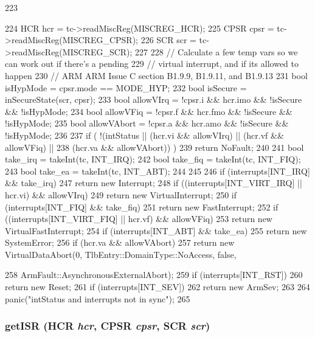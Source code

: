 \begin{DoxyCode}
223     {
224         HCR  hcr  = tc->readMiscReg(MISCREG_HCR);
225         CPSR cpsr = tc->readMiscReg(MISCREG_CPSR);
226         SCR  scr  = tc->readMiscReg(MISCREG_SCR);
227 
228         // Calculate a few temp vars so we can work out if there's a pending
229         // virtual interrupt, and if its allowed to happen
230         // ARM ARM Issue C section B1.9.9, B1.9.11, and B1.9.13
231         bool isHypMode   = cpsr.mode == MODE_HYP;
232         bool isSecure    = inSecureState(scr, cpsr);
233         bool allowVIrq   = !cpsr.i && hcr.imo && !isSecure && !isHypMode;
234         bool allowVFiq   = !cpsr.f && hcr.fmo && !isSecure && !isHypMode;
235         bool allowVAbort = !cpsr.a && hcr.amo && !isSecure && !isHypMode;
236 
237         if ( !(intStatus || (hcr.vi && allowVIrq) || (hcr.vf && allowVFiq) ||
238                (hcr.va && allowVAbort)) )
239             return NoFault;
240 
241         bool take_irq = takeInt(tc, INT_IRQ);
242         bool take_fiq = takeInt(tc, INT_FIQ);
243         bool take_ea =  takeInt(tc, INT_ABT);
244 
245 
246         if (interrupts[INT_IRQ] && take_irq)
247             return new Interrupt;
248         if ((interrupts[INT_VIRT_IRQ] || hcr.vi) && allowVIrq)
249             return new VirtualInterrupt;
250         if (interrupts[INT_FIQ] && take_fiq)
251             return new FastInterrupt;
252         if ((interrupts[INT_VIRT_FIQ] || hcr.vf) && allowVFiq)
253             return new VirtualFastInterrupt;
254         if (interrupts[INT_ABT] && take_ea)
255             return new SystemError;
256         if (hcr.va && allowVAbort)
257             return new VirtualDataAbort(0, TlbEntry::DomainType::NoAccess, false,
      
258                                  ArmFault::AsynchronousExternalAbort);
259         if (interrupts[INT_RST])
260             return new Reset;
261         if (interrupts[INT_SEV])
262             return new ArmSev;
263 
264         panic("intStatus and interrupts not in sync\n");
265     }
\end{DoxyCode}
\hypertarget{classArmISA_1_1Interrupts_a4c1c835071d8dcd4b0006a8665d11dde}{
\subsubsection[{getISR}]{ getISR (HCR {\em hcr}, \/  CPSR {\em cpsr}, \/  SCR {\em scr})}}
\label{classArmISA_1_1Interrupts_a4c1c835071d8dcd4b0006a8665d11dde}



